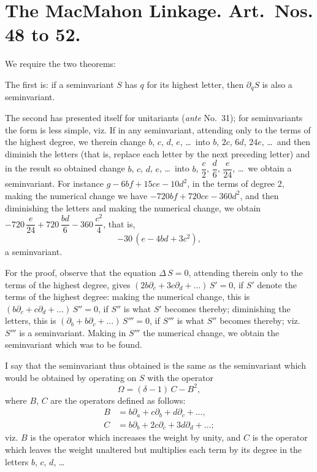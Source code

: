\documentclass[11pt,a4paper]{book}
\begin{document}
{{{\section*{The MacMahon Linkage. Art.~Nos. \textbf{48} to \textbf{52}.}

\setcounter{art}{47}
\begin{art}
We require the two theorems:

The first is: if a seminvariant $S$ has $q$ for its highest letter, then $\partial_{q}S$ is also a seminvariant.

The second has presented itself for unitariants (\textit{ante} No.~31); for seminvariants the form is less simple, viz. If in any seminvariant, attending only to the terms of the highest degree, we therein change $b$, $c$, $d$, $e$, \ldots\ into $b$, $2c$, $6d$, $24e$, \ldots\ and then diminish the letters (that is, replace each letter by the next preceding letter) and in the result so obtained change $b$, $c$, $d$, $e$, \ldots\ into $b$, $\dfrac{c}{2}$, $\dfrac{d}{6}$, $\dfrac{e}{24}$, \ldots\ we obtain a seminvariant. For instance $g - 6bf + 15ce - 10d^{2}$, in the terms of degree 2, making the numerical change we have $-720bf + 720ce - 360d^{2}$, and then diminishing the letters and making the numerical change, we obtain $-720\,\dfrac{e}{24} + 720\,\dfrac{bd}{6} - 360\,\dfrac{c^{2}}{4}$, that is,
\[
-30\,(e - 4bd + 3c^{2}),
\]
a seminvariant.
\end{art}

\setcounter{art}{48}
\begin{art}
For the proof, observe that the equation $\Delta\,S = 0$, attending therein only to the terms of the highest degree, gives $(2b\partial_{c} + 3c\partial_{d} + \ldots)\,S' = 0$, if $S'$ denote the terms of the highest degree: making the numerical change, this is $(b\partial_{c} + c\partial_{d} + \ldots)\,S'' = 0$, if $S''$ is what $S'$ becomes thereby; diminishing the letters, this is $(\partial_{b} + b\partial_{c} + \ldots)\,S''' = 0$, if $S'''$ is what $S''$ becomes thereby; viz. $S'''$ is a seminvariant. Making in $S'''$ the numerical change, we obtain the seminvariant which was to be found.
\end{art}

\setcounter{art}{49}
\begin{art}
I say that the seminvariant thus obtained is the same as the seminvariant which would be obtained by operating on $S$ with the operator
\[
\Omega = (\delta - 1)\,C - B^{2},
\]
where $B$, $C$ are the operators defined as follows:
\begin{align*}
B &= b\partial_{a} + c\partial_{b} + d\partial_{c} + \ldots,\\
C &= b\partial_{b} + 2c\partial_{c} + 3d\partial_{d} + \ldots;
\end{align*}
viz. $B$ is the operator which increases the weight by unity, and $C$ is the operator which leaves the weight unaltered but multiplies each term by its degree in the letters $b$, $c$, $d$, \ldots
\end{art}

}}}
\end{document}
